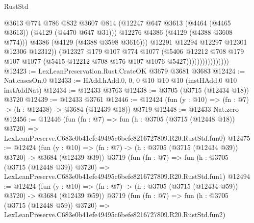 \begin{lexlean}{RustStd}
\begin{coremodule}
                                      @3613
                                      @774
                                      @786
                                      @832
                                      @3607
                                      @814
                                      (@12247
                                        @647
                                        @3613
                                        (@4464 (@4465 @3613))
                                        (@4129 (@4470 @647 @31)))
                                      @12276
                                      @4386
                                      (@4129 (@4388 @3608 @774)))
                                    @4386
                                    (@4129 (@4388 @3598 @3616)))
                                  @12291
                                  @12294
                                  @12297
                                  @12301
                                  @12306
                                  @12312))
                              (@12327
                                @179
                                @107
                                @774
                                @1077
                                (@5406
                                  @12212
                                  @708
                                  @179
                                  @107
                                  @1077
                                  (@5415 @12212 @708 @176 @107 @1076 @5427))))))))))))))))
@12423 := LexLeanPreservation.Rust.CrateOK @3679 @3681 @3683
@12424 := Nat.casesOn.{0}
@12433 := HAdd.hAdd.{0, 0, 0} @10 @10 @10 (instHAdd.{0} @10 instAddNat)
@12434 := @12433 @3763
@12438 := @3705 (@3715 (@12434 @18)) @3720
@12439 := @12433 @3761
@12446 := @12424 (fun (y : @10) => (fn : @7) -> (h : @12438) -> @3684 (@12439 @18)) @3719
@12448 := @12433 Nat.zero
@12456 := @12446
    (fun (fn : @7) =>
    fun (h : @3705 (@3715 (@12448 @18)) @3720) =>
    LexLeanPreserve.C683e0b41efe49495c6befe8216727809.R20.RustStd.fun0)
@12475 := @12424
    (fun (y : @10) => (fn : @7) -> (h : @3705 (@3715 (@12434 @39)) @3720) -> @3684 (@12439 @39))
    @3719
    (fun (fn : @7) =>
    fun (h : @3705 (@3715 (@12448 @39)) @3720) =>
    LexLeanPreserve.C683e0b41efe49495c6befe8216727809.R20.RustStd.fun1)
@12494 := @12424
    (fun (y : @10) => (fn : @7) -> (h : @3705 (@3715 (@12434 @59)) @3720) -> @3684 (@12439 @59))
    @3719
    (fun (fn : @7) =>
    fun (h : @3705 (@3715 (@12448 @59)) @3720) =>
    LexLeanPreserve.C683e0b41efe49495c6befe8216727809.R20.RustStd.fun2)

\end{coremodule}
\end{lexlean}
